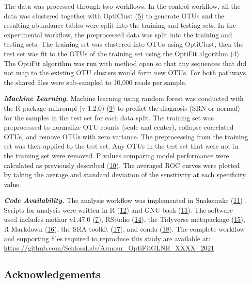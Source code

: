 \documentclass[
]{article}
\begin{document}
The data was processed through two workflows. In the control workflow,
all the data was clustered together with OptiClust
(\protect\hyperlink{ref-westcott2017}{5}) to generate OTUs and the
resulting abundance tables were split into the training and testing
sets. In the experimental workflow, the preprocessed data was split into
the training and testing sets. The training set was clustered into OTUs
using OptiClust, then the test set was fit to the OTUs of the training
set using the OptiFit algorithm
(\protect\hyperlink{ref-sovacool2022}{4}). The OptiFit algorithm was run
with method open so that any sequences that did not map to the existing
OTU clusters would form new OTUs. For both pathways, the shared files
were sub-sampled to 10,000 reads per sample.

\textbf{\emph{Machine Learning.}} Machine learning using random forest
was conducted with the R package mikrompl (v 1.2.0)
(\protect\hyperlink{ref-topuxe7uoglu2021}{9}) to predict the diagnosis
(SRN or normal) for the samples in the test set for each data split. The
training set was preprocessed to normalize OTU counts (scale and
center), collapse correlated OTUs, and remove OTUs with zero variance.
The preprocessing from the training set was then applied to the test
set. Any OTUs in the test set that were not in the training set were
removed. P values comparing model performance were calculated as
previously described (\protect\hyperlink{ref-topuxe7uoglu2020}{10}). The
averaged ROC curves were plotted by taking the average and standard
deviation of the sensitivity at each specificity value.

\textbf{\emph{Code Availability.}} The analysis workflow was implemented
in Snakemake (\protect\hyperlink{ref-koster2012}{11}) . Scripts for
analysis were written in R (\protect\hyperlink{ref-R2020}{12}) and GNU
bash (\protect\hyperlink{ref-GNUbash}{13}). The software used includes
mothur v1.47.0 (\protect\hyperlink{ref-schloss2009}{7}), RStudio
(\protect\hyperlink{ref-RStudio2019}{14}), the Tidyverse metapackage
(\protect\hyperlink{ref-wickham2019}{15}), R Markdown
(\protect\hyperlink{ref-xie_r_2018}{16}), the SRA toolkit
(\protect\hyperlink{ref-noauthor_sra-tools_nodate}{17}), and conda
(\protect\hyperlink{ref-noauthor_anaconda_2016}{18}). The complete
workflow and supporting files required to reproduce this study are
available at:
\url{https://github.com/SchlossLab/Armour_OptiFitGLNE_XXXX_2021}

\hypertarget{acknowledgements}{%
\subsection{Acknowledgements}\label{acknowledgements}}
\end{document}
